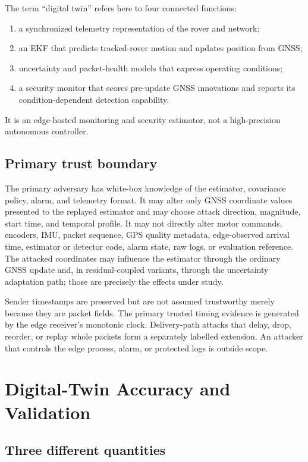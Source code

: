 \documentclass[11pt,a4paper]{article}
\begin{document}
The term ``digital twin'' refers here to four connected functions:
\begin{enumerate}
  \item a synchronized telemetry representation of the rover and network;
  \item an EKF that predicts tracked-rover motion and updates position from GNSS;
  \item uncertainty and packet-health models that express operating conditions;
  \item a security monitor that scores pre-update GNSS innovations and reports
  its condition-dependent detection capability.
\end{enumerate}
It is an edge-hosted monitoring and security estimator, not a high-precision
autonomous controller.

\subsection{Primary trust boundary}

The primary adversary has white-box knowledge of the estimator, covariance
policy, alarm, and telemetry format. It may alter only GNSS coordinate values
presented to the replayed estimator and may choose attack direction, magnitude,
start time, and temporal profile. It may not directly alter motor commands,
encoders, IMU, packet sequence, GPS quality metadata, edge-observed arrival
time, estimator or detector code, alarm state, raw logs, or evaluation
reference. The attacked coordinates may influence the estimator through the
ordinary GNSS update and, in residual-coupled variants, through the uncertainty
adaptation path; those are precisely the effects under study.

Sender timestamps are preserved but are not assumed trustworthy merely because
they are packet fields. The primary trusted timing evidence is generated by
the edge receiver's monotonic clock. Delivery-path attacks that delay, drop,
reorder, or replay whole packets form a separately labelled extension. An
attacker that controls the edge process, alarm, or protected logs is outside
scope.

\section{Digital-Twin Accuracy and Validation}
\label{sec:accuracy}

\subsection{Three different quantities}
\end{document}
